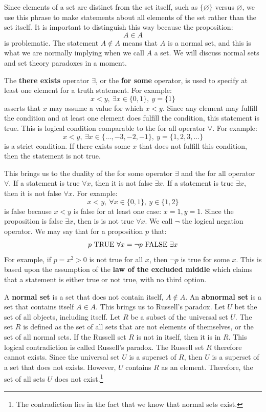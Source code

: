 \documentclass[10pt, a5paper, twoside, openright]{memoir}
\begin{document}
Since elements of a set are distinct from the set itself, such as $\{ \varnothing \}$ versus $\varnothing$, we use this phrase to make statements about all elements of the set rather than the set itself. It is important to distinguish this way because the proposition:
$$A \in A$$
is problematic. The statement $A \notin A$ means that $A$ is a normal set, and this is what we are normally implying when we call $A$ a set. We will discuss normal sets and set theory paradoxes in a moment.

The \textbf{there exists} operator $\exists$, or the \textbf{for some} operator, is used to specify at least one element for a truth statement. For example:
$$x < y, \ \exists x \in \{ {0,1} \}, \ y = \{ {1} \}$$
asserts that $x$ may assume a value for which $x < y$. Since any element may fulfill the condition and at least one element does fulfill the condition, this statement is true. This is logical condition comparable to the for all operator $\forall$. For example:
$$x < y, \ \exists x \in \{ {...,-3,-2,-1} \}, \ y = \{ 1,2,3,... \}$$
is a strict condition. If there exists some $x$ that does not fulfill this condition, then the statement is not true.

This brings us to the duality of the for some operator $\exists$ and the for all operator $\forall$. If a statement is true $\forall x$, then it is not false $\exists x$. If a statement is true $\exists x$, then it is not false $\forall x$. For example:
$$x < y, \ \forall x \in \{ {0,1} \}, \ y \in \{ {1, 2} \}$$
is false because $x < y$ is false for at least one case: $x=1, y=1$. Since the proposition is false $\exists x$, then is is not true $\forall x$. We call $\neg$ the logical negation operator. We may say that for a proposition $p$ that:
$$p \ \textnormal{TRUE} \ \forall x = \neg p \ \textnormal{FALSE} \ \exists x$$
For example, if $p = x^2 > 0$ is not true for all $x$, then $\neg p$ is true for some $x$. This is based upon the assumption of the \textbf{law of the excluded middle} which claims that a statement is either true or not true, with no third option.

A \textbf{normal set} is a set that does not contain itself, $A \notin A$. An \textbf{abnormal set} is a set that contains itself $A \in A$. This brings us to Russell's paradox. Let $U$ bet the set of all objects, including itself. Let $R$ be a subset of the universal set $U$. The set $R$ is defined as the set of all sets that are not elements of themselves, or the set of all normal sets. If the Russell set $R$ is not in itself, then it is in $R$. This logical contradiction is called Russell's paradox. The Russell set $R$ therefore cannot exists. Since the universal set $U$ is a superset of $R$, then $U$ is a superset of a set that does not exists. However, $U$ contains $R$ as an element. Therefore, the set of all sets $U$ does not exist.\footnote{The contradiction lies in the fact that we know that normal sets exist.}
\end{document}
